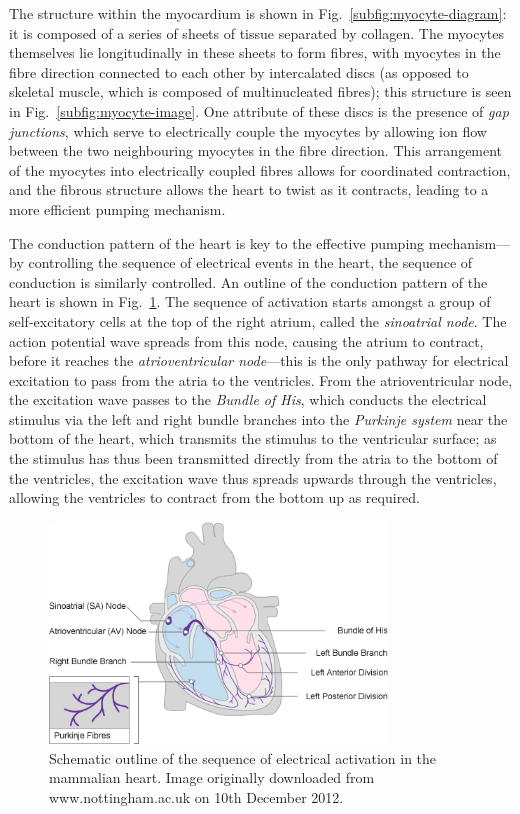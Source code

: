 \documentclass[../thesis-main.tex]{subfiles}
\begin{document}
 The structure within the myocardium is shown in Fig.~\ref{subfig:myocyte-diagram}: it is composed of a series of sheets of tissue separated by collagen. The myocytes themselves lie longitudinally in these sheets to form fibres, with myocytes in the fibre direction connected to each other by intercalated discs (as opposed to skeletal muscle, which is composed of multinucleated fibres); this structure is seen in Fig.~\ref{subfig:myocyte-image}. One attribute of these discs is the presence of \emph{gap junctions}, which serve to electrically couple the myocytes by allowing ion flow between the two neighbouring myocytes in the fibre direction. This arrangement of the myocytes into electrically coupled fibres allows for coordinated contraction, and the fibrous structure allows the heart to twist as it contracts, leading to a more efficient pumping mechanism.
 
 The conduction pattern of the heart is key to the effective pumping mechanism---by controlling the sequence of electrical events in the heart, the sequence of conduction is similarly controlled. An outline of the conduction pattern of the heart is shown in Fig.~\ref{fig:conduction-pattern}. The sequence of activation starts amongst a group of self-excitatory cells at the top of the right atrium, called the \emph{sinoatrial node}. The action potential wave spreads from this node, causing the atrium to contract, before it reaches the \emph{atrioventricular node}---this is the only pathway for electrical excitation to pass from the atria to the ventricles. From the atrioventricular node, the excitation wave passes to the \emph{Bundle of His}, which conducts the electrical stimulus via the left and right bundle branches into the \emph{Purkinje system} near the bottom of the heart, which transmits the stimulus to the ventricular surface; as the stimulus has thus been transmitted directly from the atria to the bottom of the ventricles, the excitation wave thus spreads upwards through the ventricles, allowing the ventricles to contract from the bottom up as required.
 \begin{figure}
  \centering
  \includegraphics[width=0.8\textwidth]{cardiac_conduction}
  \caption[Pattern of electrical activation in the heart]{Schematic outline of the sequence of electrical activation in the mammalian heart. Image originally downloaded from www.nottingham.ac.uk on 10th December 2012.}
  \label{fig:conduction-pattern}
 \end{figure}
 
\end{document}
